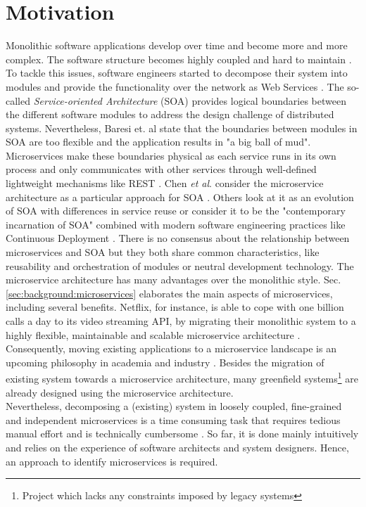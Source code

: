 \section{Motivation}
\label{sec:Introduction:Motivation}
Monolithic software applications develop over time and become more and more complex. The software structure becomes highly coupled and hard to maintain \cite{MigratingTowardsSurvey}. To tackle this issues, software engineers started to decompose their system into modules and provide the functionality over the network as Web Services \cite{ServiceCutter}. The so-called \textit{Service-oriented Architecture} (SOA) provides logical boundaries between the different software modules to address the design challenge of distributed systems. Nevertheless, Baresi et. al\cite{interfaceAnalysisBaresi} state that the boundaries between modules in SOA are too flexible and the application results in "a big ball of mud". Microservices make these boundaries physical as each service runs in its own process and only communicates with other services through well-defined lightweight mechanisms like REST \cite{FunctionalDecompositionHeinrich}. Chen \textit{et al}. consider the microservice architecture as a particular approach for SOA \cite{DataflowDrivenChen}. Others look at it as an evolution of SOA with differences in service reuse \cite{interfaceAnalysisBaresi} or consider it to be the "contemporary incarnation of SOA" combined with modern software engineering practices like Continuous Deployment \cite{ServiceCutter}. There is no consensus about the relationship between microservices and SOA but they both share common characteristics, like reusability and orchestration of modules or neutral development technology.
The microservice architecture has many advantages over the monolithic style. Sec.\ref{sec:background:microservices} elaborates the main aspects of microservices, including several benefits. Netflix, for instance, is able to cope with one billion calls a day to its video streaming API, by migrating their monolithic system to a highly flexible, maintainable and scalable microservice architecture \cite{DataflowDrivenChen}. Consequently, moving existing applications to a microservice landscape is an upcoming philosophy in academia and industry \cite{ObjectAwareAmiri}. Besides the migration of existing system towards a microservice architecture, many greenfield systems\footnote{Project which lacks any constraints imposed by legacy systems} are already designed using the microservice architecture.\\
Nevertheless, decomposing a (existing) system in loosely coupled, fine-grained and independent microservices is a time consuming task that requires tedious manual effort \cite{ServiceCutter} and is technically cumbersome \cite{HeuristicsAlwis}. So far, it is done mainly intuitively and relies on the experience of software architects and system designers. Hence, an approach to identify microservices is required. 


